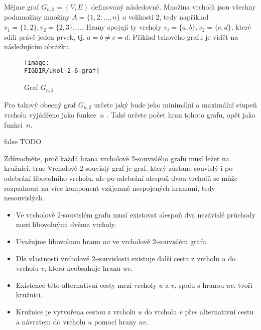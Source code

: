 \documentclass[10pt, a4paper]{ReportSheet}
\begin{document}
    \begin{uloha}{6}{2}{
        Mějme graf $G_{n,2} = (V, E)$ definovaný následovně. Množina vrcholů jsou všechny podmnožiny množiny $A = \{1, 2, \ldots, n\}$ o velikosti 2, tedy například $v_1 = \{1, 2\}, v_2 = \{2, 3\}, \ldots$. Hrany spojují ty vrcholy $v_i = \{a, b\}, v_2 = \{c, d\}$, které sdílí právě jeden prvek, tj. $a = b \ne c = d$. Příklad takového grafu je vidět na následujícím obrázku.

        \begin{figure}[H]
            \centering
            \texttt{[image: \\FIGDIR/ukol-2-6-graf]}
            \caption{Graf $G_{n,2}$}
            \label{fig:ukol-2-6-graf}
        \end{figure}

        Pro takový obecný graf $G_{n,2}$ určete jaký bude jeho minimální a maximální stupeň vrcholu vyjádřeno jako
        funkce~$n$
        . Také určete počet hran tohoto grafu, opět jako funkci~$n$.
    }{false}
        TODO
    \end{uloha}

    \begin{uloha}{7}{2}{
        Zdůvodněte, proč každá hrana vrcholově 2-souvislého grafu musí ležet na kružnici.
    }{true}
        Vrcholově 2-souvislý graf je graf, který zůstane souvislý i po odebrání libovolního vrcholu, ale po odebrání
        alespoň dvou vrcholů se může rozpadnout na více komponent vzájemně nespojených hranami, tedy nesouvislých.

        \begin{itemize}
            \item Ve vrcholově 2-souvislém grafu musí existovat alespoň dva nezávislé průchody mezi libovolnými dvěma vrcholy.
            \item Uvažujme libovolnou hranu $uv$ ve vrcholově 2-souvislém grafu.
            \item Dle vlastností vrcholové 2-souvislosti existuje další cesta z vrcholu $u$ do vrcholu $v$, která
            neobsahuje hranu $uv$.
            \item Existence této alternativní cesty mezi vrcholy $u$ a $v$, spolu s hranou $uv$, tvoří kružnici.
            \item Kružnice je vytvořena cestou z vrcholu $u$ do vrcholu $v$ přes alternativní cestu a návratem do
            vrcholu $u$ pomocí hrany $uv$.
        \end{itemize}


    \end{uloha}
\end{document}
